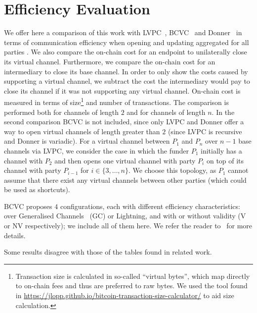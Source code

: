 \section{Efficiency Evaluation}
  \label{section:comparison}
  We offer here a comparison of this work with
  LVPC~\cite{10.1007/978-3-030-65411-5_18}, BCVC~\cite{cryptoeprint:2020:554}
  and Donner~\cite{donner} in terms of communication efficiency when opening and
  updating aggregated for all parties . We also compare
  the on-chain cost for an endpoint to unilaterally close its virtual channel.
  Furthermore, we compare the on-chain cost for an intermediary to close its
  base channel. In order to only show the costs caused by supporting a virtual
  channel, we subtract the cost the intermediary would pay to close its channel
  if it was not supporting any virtual channel. On-chain cost is measured in
  terms of size\footnote{Transaction size is calculated in so-called ``virtual
  bytes'', which map directly to on-chain fees and thus are preferred to raw
  bytes. We used the tool found in
  \url{https://jlopp.github.io/bitcoin-transaction-size-calculator/} to aid size
  calculation.} and number of transactions. The comparison is performed both for
  channels of length $2$ and for channels of length $n$. In the second
  comparison BCVC is not included, since only LVPC and Donner offer a way to
  open virtual channels of length greater than $2$ (since LVPC is recursive and
  Donner is variadic). For a virtual channel between $P_1$ and $P_n$ over $n-1$
  base channels via LVPC, we consider the case in which the funder $P_1$
  initially has a channel with $P_2$ and then opens one virtual channel with
  party $P_i$ on top of its channel with party $P_{i-1}$ for $i \in \{3, \dots,
  n\}$. We choose this topology, as $P_1$ cannot assume that there exist any
  virtual channels between other parties (which could be used as shortcuts).

  BCVC proposes $4$ configurations, each with different efficiency
  characteristics: over Generalised Channels~\cite{cryptoeprint:2020:476} (GC)
  or Lightning, and with or without validity (V or NV respectively); we include
  all of them here. We refer the reader to~\cite{cryptoeprint:2020:554} for more
  details.

   Some results disagree with those of the
  tables found in related work.

